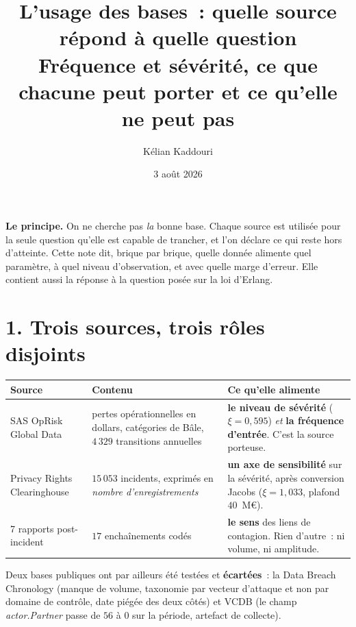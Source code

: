 \documentclass[11pt,a4paper]{article}
\title{\vspace{-1.3cm}\color{navy}\bfseries L'usage des bases~: quelle source répond à quelle question\\[3pt]
  \large Fréquence et sévérité, ce que chacune peut porter et ce qu'elle ne peut pas}
\author{Kélian Kaddouri}
\date{3 août 2026}
\begin{document}
\maketitle
\vspace{-0.8cm}

\begin{cle}
\textbf{Le principe.} On ne cherche pas \emph{la} bonne base. Chaque source est utilisée
pour la seule question qu'elle est capable de trancher, et l'on déclare ce qui reste hors
d'atteinte. Cette note dit, brique par brique, quelle donnée alimente quel paramètre, à
quel niveau d'observation, et avec quelle marge d'erreur. Elle contient aussi la réponse à
la question posée sur la loi d'Erlang.
\end{cle}

\section*{1. Trois sources, trois rôles disjoints}

\begin{center}\small
\renewcommand{\arraystretch}{1.3}
\begin{tabular}{@{}p{3.3cm} p{4.6cm} p{7.4cm}@{}}
\toprule
\textbf{Source} & \textbf{Contenu} & \textbf{Ce qu'elle alimente} \\
\midrule
SAS OpRisk Global Data & pertes opérationnelles en dollars, catégories de Bâle,
$4\,329$ transitions annuelles &
\textbf{le niveau de sévérité} ($\xi=0{,}595$) \emph{et} \textbf{la fréquence d'entrée}.
C'est la source porteuse. \\
Privacy Rights Clearinghouse & $15\,053$ incidents, exprimés en \emph{nombre
d'enregistrements} &
\textbf{un axe de sensibilité} sur la sévérité, après conversion Jacobs
($\xi=1{,}033$, plafond $40$~M\euro). \\
7 rapports post-incident & $17$ enchaînements codés &
\textbf{le sens} des liens de contagion. Rien d'autre~: ni volume, ni amplitude. \\
\bottomrule
\end{tabular}
\end{center}

\medskip
Deux bases publiques ont par ailleurs été testées et \textbf{écartées}~: la Data Breach
Chronology (manque de volume, taxonomie par vecteur d'attaque et non par domaine de
contrôle, date piégée des deux côtés) et VCDB (le champ \emph{actor.Partner} passe de $56$
à $0$ sur la période, artefact de collecte).
\end{document}
